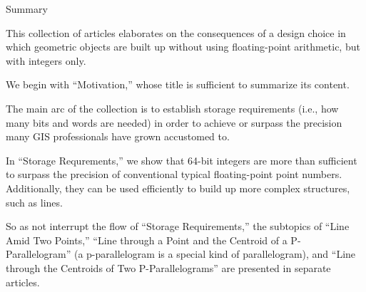 \documentclass{letter}
\begin{document}
\begin{center}
Summary
\end{center}

This collection of articles elaborates on the consequences of a
design choice in which geometric objects are built up without
using floating-point arithmetic, but with integers only.

We begin with ``Motivation,'' whose title is sufficient to
summarize its content.

The main arc of the collection is to establish storage
requirements (i.e., how many bits and words are needed) in order
to achieve or surpass the precision many GIS professionals have
grown accustomed to.

In ``Storage Requrements,'' we show that 64-bit integers are
more than sufficient to surpass the precision of conventional
typical floating-point point numbers. Additionally, they can
be used efficiently to build up more complex structures, such as
lines.

So as not interrupt the flow of ``Storage Requirements,'' the
subtopics of ``Line Amid Two Points,'' ``Line through a Point
and the Centroid of a P-Parallelogram'' (a p-parallelogram is a
special kind of parallelogram), and ``Line through the Centroids
of Two P-Parallelograms'' are presented in separate articles.
\end{document}
